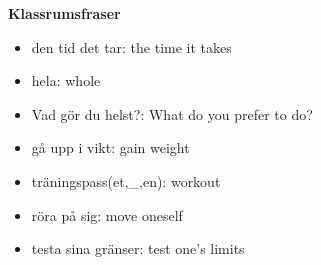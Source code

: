 
\begin{flushleft}
    \textbf{Klassrumsfraser}
    \begin{itemize}
        \item den tid det tar: the time it takes
        \item hela: whole
        \item Vad gör du helst?: What do you prefer to do?
        \item gå upp i vikt: gain weight
        \item träningspass(et,\_,en): workout
        \item röra på sig: move oneself
        \item testa sina gränser: test one's limits
    \end{itemize}
\end{flushleft}

